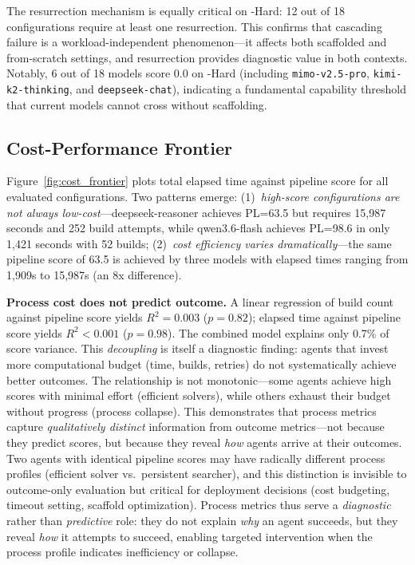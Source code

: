 The resurrection mechanism is equally critical on \yatcc{}-Hard: 12 out of 18 configurations require at least one resurrection.
This confirms that cascading failure is a workload-independent phenomenon---it affects both scaffolded and from-scratch settings, and resurrection provides diagnostic value in both contexts.
Notably, 6 out of 18 models score 0.0 on \yatcc{}-Hard (including \texttt{mimo-v2.5-pro}, \texttt{kimi-k2-thinking}, and \texttt{deepseek-chat}), indicating a fundamental capability threshold that current models cannot cross without scaffolding.

\subsection{Cost-Performance Frontier}

Figure~\ref{fig:cost_frontier} plots total elapsed time against pipeline score for all evaluated configurations.
Two patterns emerge:
(1)~\emph{high-score configurations are not always low-cost}---deepseek-reasoner achieves PL=63.5 but requires 15,987 seconds and 252 build attempts, while qwen3.6-flash achieves PL=98.6 in only 1,421 seconds with 52 builds;
(2)~\emph{cost efficiency varies dramatically}---the same pipeline score of 63.5 is achieved by three models with elapsed times ranging from 1,909s to 15,987s (an 8x difference).

\textbf{Process cost does not predict outcome.}
A linear regression of build count against pipeline score yields $R^2 = 0.003$ ($p = 0.82$); elapsed time against pipeline score yields $R^2 < 0.001$ ($p = 0.98$).
The combined model explains only 0.7\% of score variance.
This \emph{decoupling} is itself a diagnostic finding: agents that invest more computational budget (time, builds, retries) do not systematically achieve better outcomes.
The relationship is not monotonic---some agents achieve high scores with minimal effort (efficient solvers), while others exhaust their budget without progress (process collapse).
This demonstrates that process metrics capture \emph{qualitatively distinct} information from outcome metrics---not because they predict scores, but because they reveal \emph{how} agents arrive at their outcomes.
Two agents with identical pipeline scores may have radically different process profiles (efficient solver vs.\ persistent searcher), and this distinction is invisible to outcome-only evaluation but critical for deployment decisions (cost budgeting, timeout setting, scaffold optimization).
Process metrics thus serve a \emph{diagnostic} rather than \emph{predictive} role: they do not explain \emph{why} an agent succeeds, but they reveal \emph{how} it attempts to succeed, enabling targeted intervention when the process profile indicates inefficiency or collapse.

